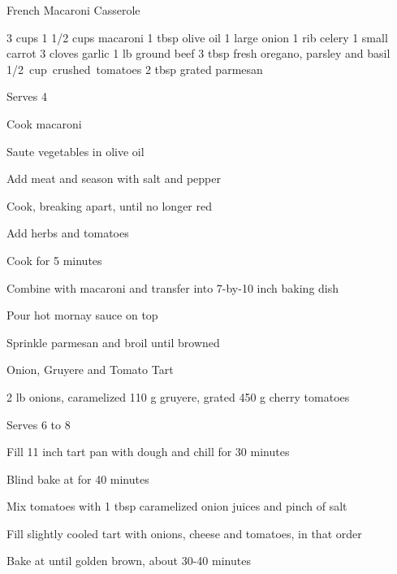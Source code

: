 \begin{denserecipe}{French Macaroni Casserole}{}
\begin{ingredients}
3 cups \mbox{}
1 1/2 cups macaroni
1 tbsp olive oil
1 large onion
1 rib celery
1 small carrot
3 cloves garlic
1 lb ground beef
3 tbsp fresh oregano, parsley and basil
\mbox{1/2 cup crushed tomatoes}
2 tbsp grated parmesan
\end{ingredients}
\nextcolumn
Serves 4
\begin{steps}
    \item Cook macaroni
    \item Saute vegetables in olive oil
    \item Add meat and season with salt and pepper
    \item Cook, breaking apart, until no longer red
    \item Add herbs and tomatoes
    \item Cook for 5 minutes
    \item Combine with macaroni and transfer into \mbox{7-by-10} inch baking dish
    \item Pour hot mornay sauce on top
    \item Sprinkle parmesan and broil until browned
\end{steps}
\end{denserecipe}

\begin{recipe}{Onion, Gruyere and Tomato Tart}{}
\begin{ingredients}
\mbox{}
2 lb onions, caramelized
110 g gruyere, grated
450 g cherry tomatoes
\end{ingredients}
\nextcolumn
Serves 6 to 8
\begin{steps}
    \item Fill 11 inch tart pan with dough and chill for 30 minutes
    \item Blind bake at  for 40 minutes
    \item Mix tomatoes with 1 tbsp caramelized onion juices and pinch of salt
    \item Fill slightly cooled tart with onions, cheese and tomatoes, in that order
    \item Bake at  until golden brown, about 30-40 minutes
\end{steps}
\end{recipe}

